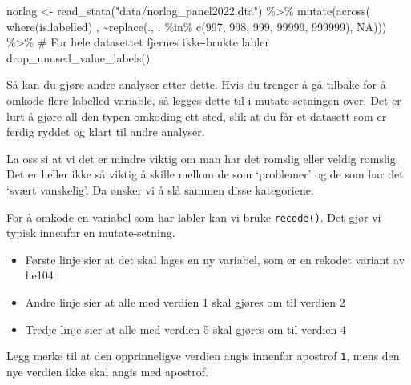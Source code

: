 \documentclass[
  letterpaper,
  DIV=11,
  numbers=noendperiod]{scrreprt}
\newenvironment{Shaded}{\begin{snugshade}}{\end{snugshade}}
\newcommand{\CommentTok}[1]{\textcolor[rgb]{0.37,0.37,0.37}{#1}}
\newcommand{\ConstantTok}[1]{\textcolor[rgb]{0.56,0.35,0.01}{#1}}
\newcommand{\DecValTok}[1]{\textcolor[rgb]{0.68,0.00,0.00}{#1}}
\newcommand{\FunctionTok}[1]{\textcolor[rgb]{0.28,0.35,0.67}{#1}}
\newcommand{\NormalTok}[1]{\textcolor[rgb]{0.00,0.23,0.31}{#1}}
\newcommand{\OtherTok}[1]{\textcolor[rgb]{0.00,0.23,0.31}{#1}}
\newcommand{\SpecialCharTok}[1]{\textcolor[rgb]{0.37,0.37,0.37}{#1}}
\newcommand{\StringTok}[1]{\textcolor[rgb]{0.13,0.47,0.30}{#1}}
\providecommand{\tightlist}{%
  \setlength{\itemsep}{0pt}\setlength{\parskip}{0pt}}\usepackage{longtable,booktabs,array}
\begin{document}
\begin{Shaded}
\begin{Highlighting}[]
\NormalTok{norlag }\OtherTok{\textless{}{-}} \FunctionTok{read\_stata}\NormalTok{(}\StringTok{"data/norlag\_panel2022.dta"}\NormalTok{) }\SpecialCharTok{\%\textgreater{}\%} 
    \FunctionTok{mutate}\NormalTok{(}\FunctionTok{across}\NormalTok{( }\FunctionTok{where}\NormalTok{(is.labelled) ,  }\SpecialCharTok{\textasciitilde{}}\FunctionTok{replace}\NormalTok{(., }
\NormalTok{                                        . }\SpecialCharTok{\%in\%} \FunctionTok{c}\NormalTok{(}\DecValTok{997}\NormalTok{, }\DecValTok{998}\NormalTok{, }\DecValTok{999}\NormalTok{, }\DecValTok{99999}\NormalTok{, }\DecValTok{999999}\NormalTok{), }
                                        \ConstantTok{NA}\NormalTok{))) }\SpecialCharTok{\%\textgreater{}\%}
  \CommentTok{\# For hele datasettet fjernes ikke{-}brukte labler }
  \FunctionTok{drop\_unused\_value\_labels}\NormalTok{()  }
\end{Highlighting}
\end{Shaded}

Så kan du gjøre andre analyser etter dette. Hvis du trenger å gå tilbake
for å omkode flere labelled-variable, så legges dette til i
mutate-setningen over. Det er lurt å gjøre all den typen omkoding ett
sted, slik at du får et datasett som er ferdig ryddet og klart til andre
analyser.

La oss si at vi det er mindre viktig om man har det romslig eller veldig
romslig. Det er heller ikke så viktig å skille mellom de som `problemer'
og de som har det `svært vanskelig'. Da ønsker vi å slå sammen disse
kategoriene.

For å omkode en variabel som har labler kan vi bruke \texttt{recode()}.
Det gjør vi typisk innenfor en mutate-setning.

\begin{itemize}
\tightlist
\item
  Første linje sier at det skal lages en ny variabel, som er en rekodet
  variant av he104
\item
  Andre linje sier at alle med verdien 1 skal gjøres om til verdien 2
\item
  Tredje linje sier at alle med verdien 5 skal gjøres om til verdien 4
\end{itemize}

Legg merke til at den opprinneligve verdien angis innenfor apostrof
\texttt{1}, mens den nye verdien ikke skal angis med apostrof.
\end{document}
